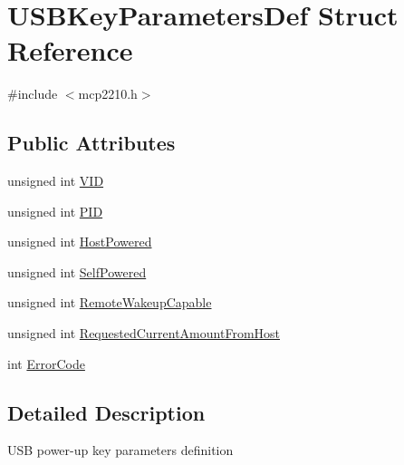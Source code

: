 \hypertarget{struct_u_s_b_key_parameters_def}{\section{\-U\-S\-B\-Key\-Parameters\-Def \-Struct \-Reference}
\label{struct_u_s_b_key_parameters_def}
}


{\ttfamily \#include $<$mcp2210.\-h$>$}

\subsection*{\-Public \-Attributes}
\begin{DoxyCompactItemize}
\item 
unsigned int \hyperlink{struct_u_s_b_key_parameters_def_a35d04341dee0696d60990dfe9b066835}{\-V\-I\-D}
\item 
unsigned int \hyperlink{struct_u_s_b_key_parameters_def_af2a7b529b80b82c0933cc8ce38723e1e}{\-P\-I\-D}
\item 
unsigned int \hyperlink{struct_u_s_b_key_parameters_def_a49d44f9a0d7bd72369090932dee48323}{\-Host\-Powered}
\item 
unsigned int \hyperlink{struct_u_s_b_key_parameters_def_aace169dc444713da0e0c0f5672d64bd0}{\-Self\-Powered}
\item 
unsigned int \hyperlink{struct_u_s_b_key_parameters_def_ab03b4a5fd9b6f7c1e8b5b10a02a2496d}{\-Remote\-Wakeup\-Capable}
\item 
unsigned int \hyperlink{struct_u_s_b_key_parameters_def_a37e6e0ff7720d067ea185fd9b19d0ba8}{\-Requested\-Current\-Amount\-From\-Host}
\item 
int \hyperlink{struct_u_s_b_key_parameters_def_aaaf11b677e036ff4847cc42bf891e786}{\-Error\-Code}
\end{DoxyCompactItemize}


\subsection{\-Detailed \-Description}
\-U\-S\-B power-\/up key parameters definition 

